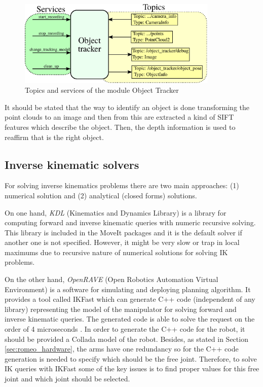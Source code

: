 \documentclass[12pt,a4paper,final,twoside,openright]{report}
\begin{document}
\begin{figure}[h]
\centering
\includegraphics[width=0.85\textwidth]{images/object_tracker.eps}
\caption{Topics and services of the module Object Tracker\label{fig:Object_tracker}}
\end{figure}

It should be stated that the way to identify an object is done transforming the point clouds to an image and then from this are extracted a kind of SIFT features which describe the object. Then, the depth information is used to reaffirm that is the right object.

\subsection{Inverse kinematic solvers}
\label{sec:inverse_kinematic}

For solving inverse kinematics problems there are two main approaches: (1) numerical solution and (2) analytical (closed forms) solutions. 

On one hand, \textit{KDL} (Kinematics and Dynamics Library)\citep{KDL} is a library for computing forward and inverse kinematic queries with numeric recursive solving. This library is included in the MoveIt packages and it is the default solver if another one is not specified. However, it might be very slow or trap in local maximums due to recursive nature of numerical solutions for solving IK problems. 

On the other hand, \textit{OpenRAVE} (Open Robotics Automation Virtual Environment)\cite{Diankov2010} is a software for simulating and deploying planning algorithm. It provides a tool called IKFast which can generate C++ code (independent of any library) representing the model of the manipulator for solving forward and inverse kinematic queries. The generated code is able  to solve the request on the order of 4 microseconds \cite{Diankov}. In order to generate the C++ code for the robot, it should be provided a Collada model \cite{KhronosGroup} of the robot. Besides, as stated in Section \ref{sec:romeo_hardware}, the arms have one redundancy so for the C++ code generation is needed to specify which should be the free joint. Therefore, to solve IK queries with IKFast some of the key issues is to find proper values for this free joint and which joint should be selected. 
\end{document}
